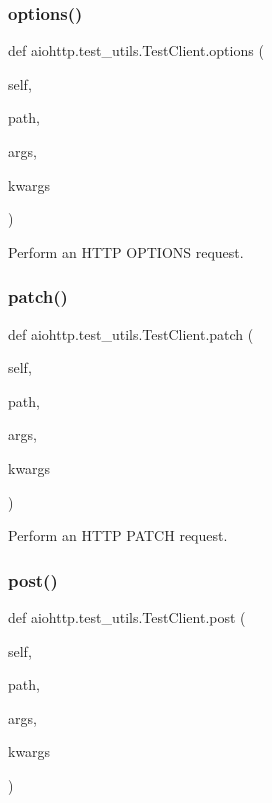 \subsubsection{\texorpdfstring{options()}{options()}}
{\footnotesize\ttfamily def aiohttp.\+test\+\_\+utils.\+Test\+Client.\+options (\begin{DoxyParamCaption}\item[{}]{self,  }\item[{}]{path,  }\item[{}]{args,  }\item[{}]{kwargs }\end{DoxyParamCaption})}

\begin{DoxyVerb}Perform an HTTP OPTIONS request.\end{DoxyVerb}
 \mbox{\label{classaiohttp_1_1test__utils_1_1_test_client_ad5b2a7b5e94af8344c6366bcfbaf604a}} 
\subsubsection{\texorpdfstring{patch()}{patch()}}
{\footnotesize\ttfamily def aiohttp.\+test\+\_\+utils.\+Test\+Client.\+patch (\begin{DoxyParamCaption}\item[{}]{self,  }\item[{}]{path,  }\item[{}]{args,  }\item[{}]{kwargs }\end{DoxyParamCaption})}

\begin{DoxyVerb}Perform an HTTP PATCH request.\end{DoxyVerb}
 \mbox{\label{classaiohttp_1_1test__utils_1_1_test_client_a2738518470feda75b40603eb7e9799fe}} 
\subsubsection{\texorpdfstring{post()}{post()}}
{\footnotesize\ttfamily def aiohttp.\+test\+\_\+utils.\+Test\+Client.\+post (\begin{DoxyParamCaption}\item[{}]{self,  }\item[{}]{path,  }\item[{}]{args,  }\item[{}]{kwargs }\end{DoxyParamCaption})}

